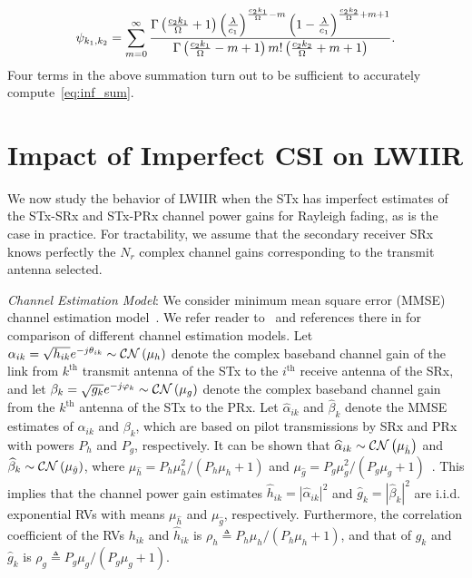\documentclass[12pt,draftcls,peerreview,onecolumn]{IEEEtran}
\newcommand{\CN}{{\cal CN}}
\newcommand{\define}{\triangleq}
\newcommand{\lam}{\lambda}
\newcommand{\mug}{{\mu_{g}}}
\newcommand{\muh}{{\mu_{h}}}
\newcommand{\Nr}{{N_r}}
\newcommand{\such}{h}
\newcommand{\puch}{g}
\newcommand{\hk}[1]{{\such_{#1}}}
\newcommand{\gk}[1]{{\puch_{#1}}}
\newcommand{\cone}{c_{1}}
\newcommand{\ctwo}{c_{2}}
\newcommand{\lambym}{\frac{\lam}{\cone}}
\newcommand{\al}{\ctwo}
\newcommand{\snr}{\Omega}
\newcommand{\albysnr}[1][]{\frac{\al#1}{\snr}}
\newcommand{\suchph}{\theta}
\newcommand{\puchph}{\varphi}
\newcommand{\psifun}[2]{\psi_{{#1},{#2}}}
\newcommand{\ith}{i^{\text{th}}}
\newcommand{\kth}{k^{\text{th}}}
\newcommand{\akone}{\albysnr[k_1]}
\newcommand{\sug}{\alpha}
\newcommand{\pug}{\beta}
\newcommand{\sugain}[1]{\sug_{#1}}
\newcommand{\pugain}[1]{\pug_{#1}}
\newcommand{\sugainhat}[1]{\widehat{\sug}_{#1}}
\newcommand{\pugainhat}[1]{\widehat{\pug}_{#1}}
\newcommand{\gpilotpower}{P_g}
\newcommand{\hpilotpower}{P_h}
\newcommand{\hhat}{\hat{\such}}
\newcommand{\ghat}{\hat{\puch}}
\newcommand{\hkhat}[1]{\hhat_{#1}}
\newcommand{\gkhat}[1]{\ghat_{#1}}
\newcommand{\muhhat}{\mu_{\hhat}}
\newcommand{\mughat}{\mu_{\ghat}}
\newcommand{\rhog}{\rho_g}
\newcommand{\rhoh}{\rho_h}
\begin{document}
%
\begin{equation}
\psifun{k_1}{k_2} = \sum_{\midx=0}^{\infty} \frac{\Gamma\left(\akone+1 \right) \left(\lambym\right)^{\albysnr[k_1]  - \midx} \left(1-\lambym\right)^{\albysnr[k_2]+\midx+1}}{\Gamma\left(\akone-\midx+1 \right)\midx ! \left(\albysnr[k_2]+\midx+1\right)}. 
\label{eq:inf_sum}
\end{equation}
Four terms in the above summation turn out to be sufficient to accurately compute~\eqref{eq:inf_sum}.  
%
%


\section{Impact of Imperfect CSI on LWIIR}
\label{sec:imperfectcsi}
We now study the behavior of LWIIR when the STx has imperfect estimates of the STx-SRx and STx-PRx channel power gains for Rayleigh fading, as is the case in practice. For tractability, we assume that the secondary receiver SRx knows perfectly the $\Nr$ complex channel gains corresponding to the transmit antenna selected. %


{\em Channel Estimation Model}: We consider minimum mean square error (MMSE) channel estimation model~\cite{Sboui_2013_TWC,Kashyap_2014_TCOM,musavian_2009_tcom}. We refer reader to~\cite{Zhang_2017_tcom,Kashyap_2015_wicomlet} and references there in for comparison of different channel estimation models.  Let $ \sugain{ik}= \sqrt{\hk{ik}}e^{-j\suchph_{ik}}\sim\CN\left(\muh\right) $ denote the complex baseband channel gain of the link from $\kth$ transmit antenna of the STx to the $\ith$ receive antenna of the SRx, and let $\pugain{k} = \sqrt{\gk{k}}e^{-j\puchph_{k}}\sim\CN\left(\mug\right)$ denote the complex baseband channel gain from the $\kth$ antenna of the STx to the PRx. Let $\sugainhat{ik}$ and $\pugainhat{k}$ denote the MMSE estimates of $\sugain{ik}$ and $\pugain{k}$, which are based on pilot transmissions by SRx and PRx with powers $\hpilotpower$ and $\gpilotpower$, respectively.  It can be shown that  $\sugainhat{ik}\sim\CN\left(\muhhat \right)$ and $\pugainhat{k}\sim \CN\left(\mughat\right)$, where  $\muhhat ={\hpilotpower\mu^2_{\such}}/{\left( \hpilotpower\muh+1\right)}$ and $\mughat = {\gpilotpower\mu^2_{\puch}}/{\left( \gpilotpower\mug+1\right)}$~\cite{Kashyap_2014_TCOM}.  
This implies that the channel power gain estimates $\hkhat{ik}=|\sugainhat{ik}|^2$ and $\gkhat{k}=|\pugainhat{k}|^2$ are i.i.d. exponential RVs with means $\muhhat$ and $\mughat$, respectively. Furthermore, the correlation coefficient  of the RVs $\hk{ik}$ and $\hkhat{ik}$ is $\rhoh\define{\hpilotpower\muh}/{\left( \hpilotpower\muh + 1\right) }$, and that of $\gk{k}$ and $\gkhat{k}$ is $\rhog \define{\gpilotpower\mug}/{\left( \gpilotpower\mug + 1\right) }$. 
\end{document}
